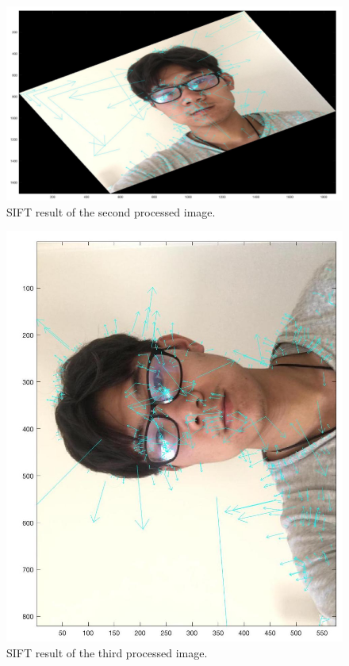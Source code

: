 \documentclass{article}
\begin{document}
\begin{figure}[htbp]
    \centering
    \includegraphics[scale = 0.1]{fig21.jpg}
    \caption{SIFT result of the second processed image.}
    \label{fig21}
\end{figure}

\begin{figure}[htbp]
    \centering
    \includegraphics[scale = 0.1]{fig22.jpg}
    \caption{SIFT result of the third processed image.}
    \label{fig22}
\end{figure}
\end{document}
